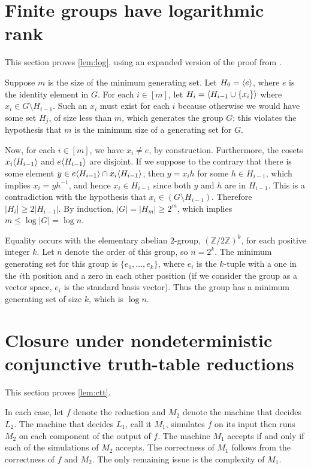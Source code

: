\section{Finite groups have logarithmic rank}\label{app:log}
This section proves \autoref{lem:log}, using an expanded version of the proof from \autocite{arvind07}.

Suppose $m$ is the size of the minimum generating set.
Let $H_0 = \langle e \rangle$, where $e$ is the identity element in $G$.
For each $i \in [m]$, let $H_i = \langle H_{i - 1} \cup \{x_i\} \rangle$ where $x_i \in G \setminus H_{i - 1}$.
Such an $x_i$ must exist for each $i$ because otherwise we would have some set $H_j$, of size less than $m$, which generates the group $G$; this violates the hypothesis that $m$ is the minimum size of a generating set for $G$.

Now, for each $i \in [m]$, we have $x_i \neq e$, by construction.
Furthermore, the cosets $x_i \langle H_{i - 1} \rangle$ and $e \langle H_{i - 1} \rangle$ are disjoint.
If we suppose to the contrary that there is some element $y \in e \langle H_{i - 1} \rangle \cap x_i \langle H_{i - 1} \rangle$, then $y = x_i h$ for some $h \in H_{i - 1}$, which implies $x_i = yh^{-1}$, and hence $x_i \in H_{i - 1}$ since both $y$ and $h$ are in $H_{i - 1}$.
This is a contradiction with the hypothesis that $x_i \in (G \setminus H_{i - 1})$.
Therefore $|H_i| \geq 2 |H_{i - 1}|$.
By induction, $|G| = |H_m| \geq 2^m$, which implies $m \leq \log |G| = \log n$.

Equality occurs with the elementary abelian $2$-group, $(\mathbb{Z} / 2 \mathbb{Z})^k$, for each positive integer $k$.
Let $n$ denote the order of this group, so $n = 2^k$.
The minimum generating set for this group is $\{e_1, \dotsc, e_k\}$, where $e_i$ is the $k$-tuple with a one in the $i$th position and a zero in each other position (if we consider the group as a vector space, $e_i$ is the standard basis vector).
Thus the group has a minimum generating set of size $k$, which is $\log n$.

\section{Closure under nondeterministic conjunctive truth-table reductions}\label{app:closure}
This section proves \autoref{lem:ctt}.

In each case, let $f$ denote the reduction and $M_2$ denote the machine that decides $L_2$.
The machine that decides $L_1$, call it $M_1$, simulates $f$ on its input then runs $M_2$ on each component of the output of $f$.
The machine $M_1$ accepts if and only if each of the simulations of $M_2$ accepts.
The correctness of $M_1$ follows from the correctness of $f$ and $M_2$.
The only remaining issue is the complexity of $M_1$.

